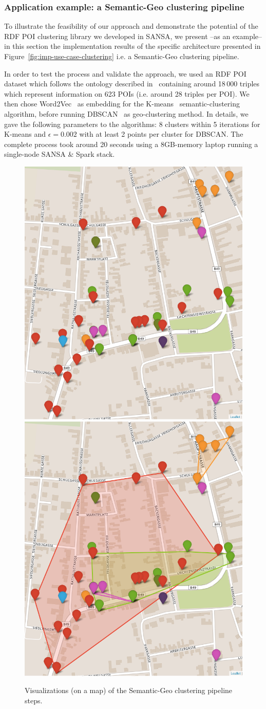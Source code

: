 \subsubsection{Application example: a Semantic-Geo clustering pipeline}

To illustrate the feasibility of our approach and demonstrate the potential of the \gls{RDF} \gls{POI} clustering library we developed in SANSA, we present --as an example-- in this section the implementation results of the specific architecture presented in Figure~\ref{fig:imp-use-case-clustering} i.e. a Semantic-Geo clustering pipeline.

In order to test the process and validate the approach, we used an \gls{RDF} \gls{POI} dataset which follows the ontology described in~\cite{Athanasiou2019BigPD} containing around 18\,000 triples which represent information on 623 \gls{POI}s (i.e. around 28 triples per \gls{POI}). We then chose Word2Vec~\cite{mikolov2013distributed} as embedding for the K-means~\cite{kmeans-algo} semantic-clustering algorithm, before running DBSCAN~\cite{ester1996density} as geo-clustering method. In details, we gave the following parameters to the algorithms: 8 clusters within 5 iterations for K-means and $\epsilon=0.002$ with at least 2 points per cluster for DBSCAN.
The complete process took around 20 seconds using a 8GB-memory laptop running a single-node SANSA \& Spark stack.

\begin{figure}
    \centering
    \includegraphics[width=.49\textwidth]{images/7_implemenation_and_usecases/kmean.png}
	\includegraphics[width=.49\textwidth]{images/7_implemenation_and_usecases/kmeandbscan.png}
    \caption{Visualizations (on a map) of the Semantic-Geo clustering pipeline steps.}
    \label{fig:imp-use-cases-map}
\end{figure}

